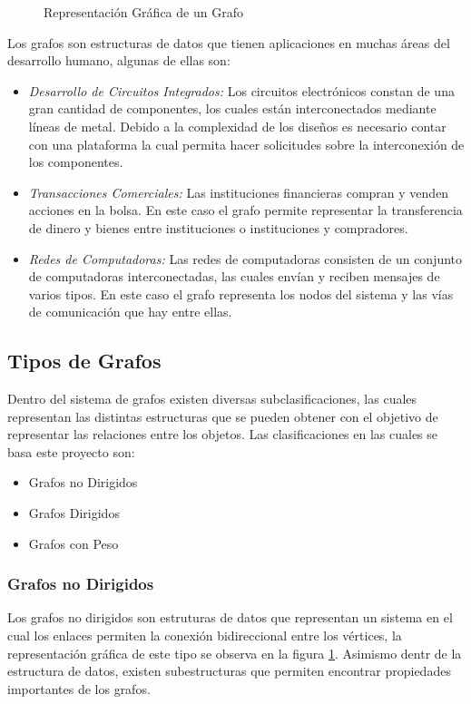 \documentclass[a4paper, 11pt]{report}
\newcommand{\DrawGraph}[5]{

    \begin{scope}[#4]
    \foreach \pos/\nodo in {{(0,0)/1}, {(2,1)/2}, {(4,1)/3}, {(0,2)/4}, {(3,0)/5}, {(2,-1)/6}, {(4,-1)/7}}
        \node[vertex] (#3\nodo) at \pos {\nodo};

    \foreach \start/\end in {1/4, 1/2, 1/6,2/5,2/3,2/6,5/7,3/7,4/2,6/7}
        \path[edge,#5] (#3\start) -- (#3\end);

    \foreach \nodo in {#1}
        \node[selected vertex] at (#3\nodo) {\nodo};
        

    \begin{pgfonlayer}{background}
        \foreach \start/\end in {#2}
            \path[selected edge,#5] (#3\start) -- (#3\end);
    \end{pgfonlayer}
    \end{scope}
}
\begin{document}
\begin{figure}[!h]
    \centering
    \caption{Representaci\'on Gr\'afica de un Grafo}
    \label{EjGrafo}
\end{figure}

Los grafos son estructuras de datos que tienen aplicaciones en muchas \'areas del desarrollo humano, algunas de ellas son:

\begin{itemize}
    \item \emph{Desarrollo de Circuitos Integrados:} Los circuitos electr\'onicos constan de una gran cantidad de componentes, los cuales est\'an interconectados mediante l\'ineas de metal. Debido a la complexidad de los dise\~nos es necesario contar con una plataforma la cual permita hacer solicitudes sobre la interconexi\'on de los componentes.
    \item \emph{Transacciones Comerciales:} Las instituciones financieras compran y venden acciones en la bolsa. En este caso el grafo permite representar la transferencia de dinero y bienes entre instituciones o instituciones y compradores.
    \item \emph{Redes de Computadoras:} Las redes de computadoras consisten de un conjunto de computadoras interconectadas, las cuales env\'ian y reciben mensajes de varios tipos. En este caso el grafo representa los nodos del sistema y las v\'ias de comunicaci\'on que hay entre ellas. 
\end{itemize}

\subsection{Tipos de Grafos}
Dentro del sistema de grafos existen diversas subclasificaciones, las cuales representan las distintas estructuras que se pueden obtener con el objetivo de representar las relaciones entre los objetos. Las clasificaciones en las cuales se basa este proyecto son:

\begin{itemize}
    \item Grafos no Dirigidos
    \item Grafos Dirigidos
    \item Grafos con Peso
\end{itemize}

\subsubsection{Grafos no Dirigidos}
Los grafos no dirigidos son estruturas de datos que representan un sistema en el cual los enlaces permiten la conexi\'on bidireccional entre los v\'ertices, la representaci\'on gr\'afica de este tipo se observa en la figura \ref{EjGrafo}. Asimismo dentr de la estructura de datos, existen subestructuras que permiten encontrar propiedades importantes de los grafos.
\end{document}

